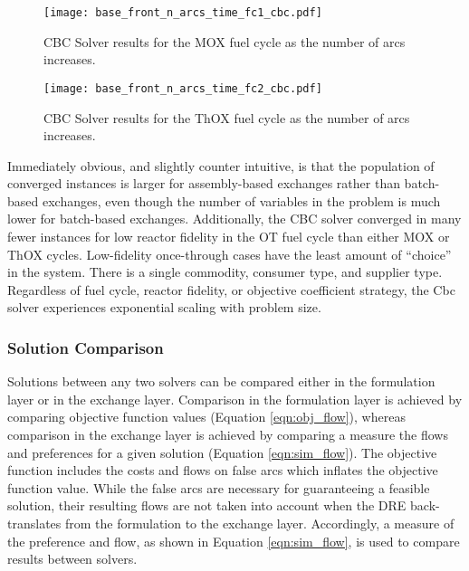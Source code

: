 \begin{figure}[h!]
  \begin{center}
    \texttt{[image: base\_front\_n\_arcs\_time\_fc1\_cbc.pdf]}
    \caption[]{
      \label{fig:base_front_n_arcs_time_fc1_cbc}
      CBC Solver results for the MOX fuel cycle as the number of arcs
      increases.
      }
  \end{center}
\end{figure}

\begin{figure}[h!]
  \begin{center}
    \texttt{[image: base\_front\_n\_arcs\_time\_fc2\_cbc.pdf]}
    \caption[]{
      \label{fig:base_front_n_arcs_time_fc2_cbc}
      CBC Solver results for the ThOX fuel cycle as the number of arcs
      increases.
      }
  \end{center}
\end{figure}

Immediately obvious, and slightly counter intuitive, is that the population of
converged instances is larger for assembly-based exchanges rather than
batch-based exchanges, even though the number of variables in the problem is
much lower for batch-based exchanges. Additionally, the CBC solver converged in
many fewer instances for low reactor fidelity in the OT fuel cycle than either
MOX or ThOX cycles. Low-fidelity once-through cases have the least amount of
``choice'' in the system. There is a single commodity, consumer type, and
supplier type. Regardless of fuel cycle, reactor fidelity, or objective
coefficient strategy, the Cbc solver experiences exponential scaling with
problem size.

\subsubsection{Solution Comparison}\label{sec:res:scale:front:soln}

Solutions between any two solvers can be compared either in the formulation
layer or in the exchange layer. Comparison in the formulation layer is achieved
by comparing objective function values (Equation \ref{eqn:obj_flow}), whereas
comparison in the exchange layer is achieved by comparing a measure the flows
and preferences for a given solution (Equation \ref{eqn:sim_flow}). The
objective function includes the costs and flows on false arcs which inflates the
objective function value. While the false arcs are necessary for guaranteeing a
feasible solution, their resulting flows are not taken into account when the DRE
back-translates from the formulation to the exchange layer. Accordingly, a
measure of the preference and flow, as shown in Equation \ref{eqn:sim_flow}, is
used to compare results between solvers.

